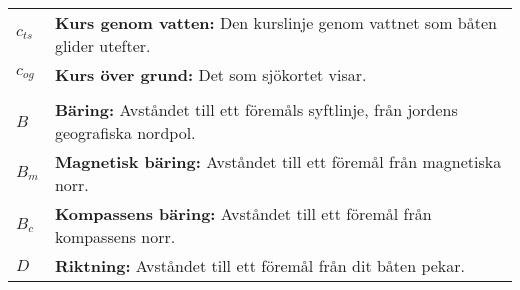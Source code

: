 \documentclass[a4paper, 12pt]{article}
\newcommand{\textmathbearing}{B}
\newcommand{\textmathbearingmagnetic}{B_m}
\newcommand{\textmathbearingcompass}{B_c}
\newcommand{\textmathdirection}{D}
\newcommand{\textmathcts}{c_{ts}}
\newcommand{\textmathcog}{c_{og}}
\newcommand{\textmathbearing}{B}
\newcommand{\textmathbearingmagnetic}{B_m}
\newcommand{\textmathbearingcompass}{B_k}
\newcommand{\textmathdirection}{R}
\newcommand{\textmathcts}{k_{gv}}
\newcommand{\textmathcog}{k_{\ddot{o}g}}
\begin{document}
{\begin{tabular}{p{} p{}}
    $\textmathcts$               & \textbf{Kurs genom vatten:} Den kurslinje genom vattnet som båten glider utefter.\\
    $\textmathcog$               & \textbf{Kurs över grund:} Det som sjökortet visar.\\
                                 & \\
    $\textmathbearing$           & \textbf{Bäring:} Avståndet till ett föremåls syftlinje, från jordens geografiska nordpol.\\
    $\textmathbearingmagnetic$   & \textbf{Magnetisk bäring:} Avståndet till ett föremål från magnetiska norr.\\
    $\textmathbearingcompass$    & \textbf{Kompassens bäring:} Avståndet till ett föremål från kompassens norr.\\
    $\textmathdirection$         & \textbf{Riktning:} Avståndet till ett föremål från dit båten pekar.\\
  \end{tabular}
}
\end{document}
